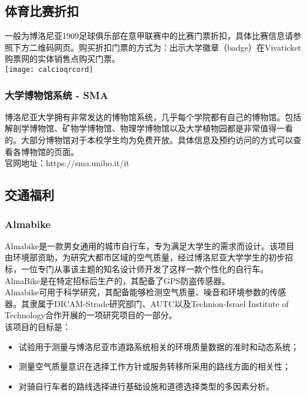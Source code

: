 \subsection{体育比赛折扣}
一般为博洛尼亚1909足球俱乐部在意甲联赛中的比赛门票折扣，具体比赛信息请参照下方二维码网页。购买折扣门票的方式为：出示大学徽章（badge）在Vivaticket购票网的实体销售点购买门票。\\
\texttt{[image: calcioqrcord]}\\

\subsubsection{大学博物馆系统 - SMA}
博洛尼亚大学拥有非常发达的博物馆系统，几乎每个学院都有自己的博物馆。包括解剖学博物馆、矿物学博物馆、物理学博物馆以及大学植物园都是非常值得一看的。大部分博物馆对于本校学生均为免费开放。具体信息及预约访问的方式可以查看各博物馆的页面。\\
官网地址：https://sma.unibo.it/it

\subsection{交通福利}

\subsubsection{Almabike}
Almabike是一款男女通用的城市自行车，专为满足大学生的需求而设计。该项目由环境部资助，为研究大都市区域的空气质量，经过博洛尼亚大学学生的初步招标，一位专门从事该主题的知名设计师开发了这样一款个性化的自行车。AlmaBike是在特定招标后生产的，其配备了GPS防盗传感器。\\
Almabike可用于科学研究，其配备能够检测空气质量、噪音和环境参数的传感器。其隶属于DICAM-Strade研究部门、AUTC以及Technion-Israel Institute of Technology合作开展的一项研究项目的一部分。\\
该项目的目标是：
\begin{itemize}
 \item 试验用于测量与博洛尼亚市道路系统相关的环境质量数据的准时和动态系统；
 \item 测量空气质量意识在选择工作方针或服务转移所采用的路线方面的相关性； 
 \item 对骑自行车者的路线选择进行基础设施和道德选择类型的多因素分析。
\end{itemize} 

